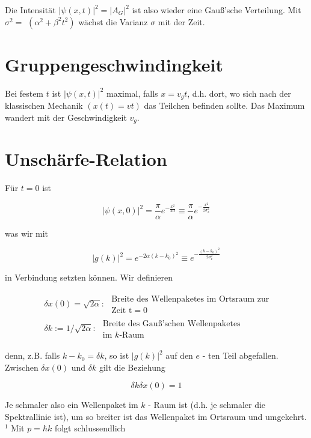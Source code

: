\documentclass[10pt, letterpaper]{article}
\begin{document}
Die Intensität $|\psi(x, t)|^{2}=\left|A_{G}\right|^{2}$ ist also wieder eine Gauß'sche Verteilung. Mit $\sigma^{2}=$ $\left(\alpha^{2}+\beta^{2} t^{2}\right)$ wächst die Varianz $\sigma$ mit der Zeit.

\section*{Gruppengeschwindingkeit}
Bei festem $t$ ist $|\psi(x, t)|^{2}$ maximal, falls $x=v_{g} t$, d.h. dort, wo sich nach der klassischen Mechanik $(x(t)=v t)$ das Teilchen befinden sollte. Das Maximum wandert mit der Geschwindigkeit $v_{g}$.

\section*{Unschärfe-Relation}
Für $t=0$ ist

$$
|\psi(x, 0)|^{2}=\frac{\pi}{\alpha} e^{-\frac{x^{2}}{2 \alpha}} \equiv \frac{\pi}{\alpha} e^{-\frac{x^{2}}{2 \sigma_{x}^{2}}}
$$

was wir mit

$$
|g(k)|^{2}=e^{-2 \alpha\left(k-k_{0}\right)^{2}} \equiv e^{-\frac{\left(k-k_{0}\right)^{2}}{2 \sigma_{k}^{2}}}
$$

in Verbindung setzten können. Wir definieren

$$
\begin{aligned}
& \delta x(0)=\sqrt{2 \alpha}: \begin{array}{l}
\text { Breite des Wellenpaketes im Ortsraum zur } \\
\text { Zeit } \mathrm{t}=0
\end{array} \\
& \delta k:=1 / \sqrt{2 \alpha}: \begin{array}{l}
\text { Breite des Gauß'schen Wellenpaketes } \\
\text { im } k \text {-Raum }
\end{array}
\end{aligned}
$$

denn, z.B. falls $k-k_{0}=\delta k$, so ist $|g(k)|^{2}$ auf den $e$ - ten Teil abgefallen. Zwischen $\delta x(0)$ und $\delta k$ gilt die Beziehung

$$
\delta k \delta x(0)=1
$$

Je schmaler also ein Wellenpaket im $k$ - Raum ist (d.h. je schmaler die Spektrallinie ist), um so breiter ist das Wellenpaket im Ortsraum und umgekehrt. ${ }^{1}$ Mit $p=\hbar k$ folgt schlussendlich
\end{document}
